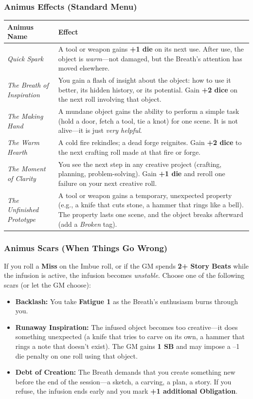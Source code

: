 \subsubsection*{Animus Effects (Standard Menu)}
\begin{longtable}{|p{}|p{}|}
\hline
\textbf{Animus Name} & \textbf{Effect} \\
\hline
\textit{Quick Spark} & A tool or weapon gains \textbf{+1 die} on its next use. After use, the object is \textit{warm}---not damaged, but the Breath's attention has moved elsewhere. \\
\hline
\textit{The Breath of Inspiration} & You gain a flash of insight about the object: how to use it better, its hidden history, or its potential. Gain \textbf{+2 dice} on the next roll involving that object. \\
\hline
\textit{The Making Hand} & A mundane object gains the ability to perform a simple task (hold a door, fetch a tool, tie a knot) for one scene. It is not alive---it is just \textit{very helpful}. \\
\hline
\textit{The Warm Hearth} & A cold fire rekindles; a dead forge reignites. Gain \textbf{+2 dice} to the next crafting roll made at that fire or forge. \\
\hline
\textit{The Moment of Clarity} & You see the next step in any creative project (crafting, planning, problem-solving). Gain \textbf{+1 die} and reroll one failure on your next creative roll. \\
\hline
\textit{The Unfinished Prototype} & A tool or weapon gains a temporary, unexpected property (e.g., a knife that cuts stone, a hammer that rings like a bell). The property lasts one scene, and the object breaks afterward (add a \textit{Broken} tag). \\
\hline
\end{longtable}

\subsubsection*{Animus Scars (When Things Go Wrong)}
If you roll a \textbf{Miss} on the Imbue roll, or if the GM spends \textbf{2+ Story Beats} while the infusion is active, the infusion becomes \textit{unstable}. Choose one of the following scars (or let the GM choose):
\begin{itemize}
  \item \textbf{Backlash:} You take \textbf{Fatigue 1} as the Breath's enthusiasm burns through you.
  \item \textbf{Runaway Inspiration:} The infused object becomes too creative---it does something unexpected (a knife that tries to carve on its own, a hammer that rings a note that doesn't exist). The GM gains \textbf{1 SB} and may impose a --1 die penalty on one roll using that object.
  \item \textbf{Debt of Creation:} The Breath demands that you create something new before the end of the session---a sketch, a carving, a plan, a story. If you refuse, the infusion ends early and you mark \textbf{+1 additional Obligation}.
\end{itemize}

